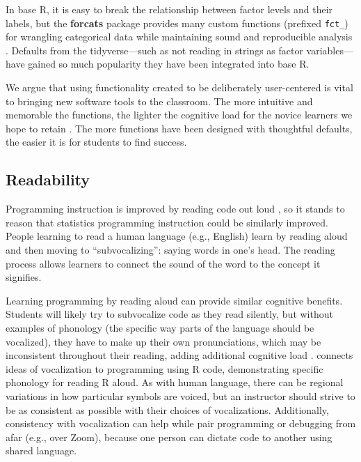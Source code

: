 \documentclass[12pt]{article}
\begin{document}
In base R, it is easy to break the relationship between factor levels
and their labels, but the \textbf{forcats} package \citep{R-forcats}
provides many custom functions (prefixed \texttt{fct\_}) for wrangling
categorical data while maintaining sound and reproducible analysis
\citep{mcnamara2018wrangling}. Defaults from the tidyverse---such as not
reading in strings as factor variables---have gained so much popularity
they have been integrated into base R.

We argue that using functionality created to be deliberately
user-centered is vital to bringing new software tools to the classroom.
The more intuitive and memorable the functions, the lighter the
cognitive load for the novice learners we hope to retain
\citep{burr2021, fergusson2021, mcnamaraetal2021a, lovettgreenhouse2000}.
The more functions have been designed with thoughtful defaults, the
easier it is for students to find success.

\hypertarget{sec:reading}{%
\subsection{Readability}\label{sec:reading}}

Programming instruction is improved by reading code out loud
\citep{SwiHer2019}, so it stands to reason that statistics programming
instruction could be similarly improved. People learning to read a human
language (e.g., English) learn by reading aloud and then moving to
``subvocalizing'': saying words in one's head. The reading process
allows learners to connect the sound of the word to the concept it
signifies.

Learning programming by reading aloud can provide similar cognitive
benefits. Students will likely try to subvocalize code as they read
silently, but without examples of phonology (the specific way parts of
the language should be vocalized), they have to make up their own
pronunciations, which may be inconsistent throughout their reading,
adding additional cognitive load \citep{HerSwi2018}. \citet{McN2020}
connects ideas of vocalization to programming using R code,
demonstrating specific phonology for reading R aloud. As with human
language, there can be regional variations in how particular symbols are
voiced, but an instructor should strive to be as consistent as possible
with their choices of vocalizations. Additionally, consistency with
vocalization can help while pair programming or debugging from afar
(e.g., over Zoom), because one person can dictate code to another using
shared language.
\end{document}
